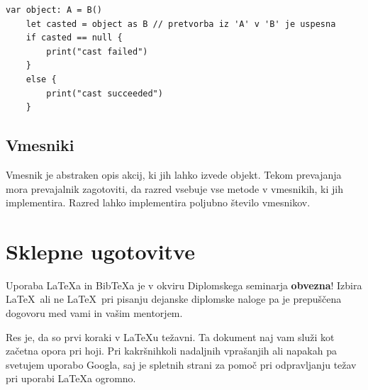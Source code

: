 \documentclass[a4paper, 12pt]{book}
\newcommand{\BibTeX}{{\sc Bib}\TeX}
\begin{document}
\begin{lstlisting}[caption={Pretvorba razrede iz sheme ~\ref{vtables}}, captionpos=b]
	var object: A = B()
	let casted = object as B // pretvorba iz 'A' v 'B' je uspesna
	if casted == null {
	    print("cast failed")
	}
	else {
	    print("cast succeeded")
	}
\end{lstlisting}

\section{Vmesniki}

Vmesnik je abstraken opis akcij, ki jih lahko izvede objekt. Tekom prevajanja mora prevajalnik zagotoviti, da razred vsebuje vse metode v vmesnikih, ki jih implementira. Razred lahko implementira poljubno število vmesnikov. \\
\indent 


\chapter{Sklepne ugotovitve}

Uporaba \LaTeX{a} in \BibTeX{a} je v okviru Diplomskega seminarja \textbf{obvezna}!
Izbira \LaTeX\ ali ne \LaTeX\ pri pisanju dejanske diplomske naloge pa je pre\-pu\-šče\-na dogovoru med vami in vašim mentorjem.

Res je, da so prvi koraki v \LaTeX{}u težavni. 
Ta dokument naj vam služi kot začetna opora pri hoji.
Pri kakršnihkoli nadaljnih vprašanjih ali napakah pa svetujem uporabo Googla, saj je spletnih strani za pomoč pri odpravljanju težav pri uporabi \LaTeX{}a ogromno.


\newpage %

\clearpage
{}


\end{document}
